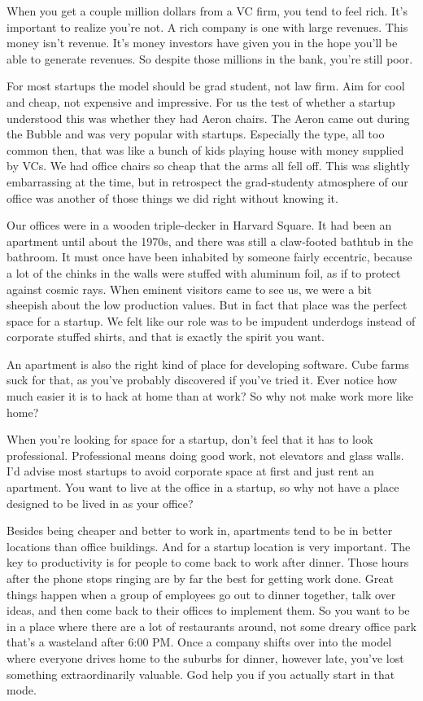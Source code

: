 \documentclass[12pt]{book}
\begin{document}
When you get a couple million dollars from a VC firm, you tend to feel
rich. It's important to realize you're not. A rich company is one with
large revenues. This money isn't revenue. It's money investors have
given you in the hope you'll be able to generate revenues. So despite
those millions in the bank, you're still poor.

For most startups the model should be grad student, not law firm. Aim
for cool and cheap, not expensive and impressive. For us the test of
whether a startup understood this was whether they had Aeron chairs. The
Aeron came out during the Bubble and was very popular with startups.
Especially the type, all too common then, that was like a bunch of kids
playing house with money supplied by VCs. We had office chairs so cheap
that the arms all fell off. This was slightly embarrassing at the time,
but in retrospect the grad-studenty atmosphere of our office was another
of those things we did right without knowing it.

Our offices were in a wooden triple-decker in Harvard Square. It had
been an apartment until about the 1970s, and there was still a
claw-footed bathtub in the bathroom. It must once have been inhabited by
someone fairly eccentric, because a lot of the chinks in the walls were
stuffed with aluminum foil, as if to protect against cosmic rays. When
eminent visitors came to see us, we were a bit sheepish about the low
production values. But in fact that place was the perfect space for a
startup. We felt like our role was to be impudent underdogs instead of
corporate stuffed shirts, and that is exactly the spirit you want.

An apartment is also the right kind of place for developing software.
Cube farms suck for that, as you've probably discovered if you've tried
it. Ever notice how much easier it is to hack at home than at work? So
why not make work more like home?

When you're looking for space for a startup, don't feel that it has to
look professional. Professional means doing good work, not elevators and
glass walls. I'd advise most startups to avoid corporate space at first
and just rent an apartment. You want to live at the office in a startup,
so why not have a place designed to be lived in as your office?

Besides being cheaper and better to work in, apartments tend to be in
better locations than office buildings. And for a startup location is
very important. The key to productivity is for people to come back to
work after dinner. Those hours after the phone stops ringing are by far
the best for getting work done. Great things happen when a group of
employees go out to dinner together, talk over ideas, and then come back
to their offices to implement them. So you want to be in a place where
there are a lot of restaurants around, not some dreary office park
that's a wasteland after 6:00 PM. Once a company shifts over into the
model where everyone drives home to the suburbs for dinner, however
late, you've lost something extraordinarily valuable. God help you if
you actually start in that mode.
\end{document}
